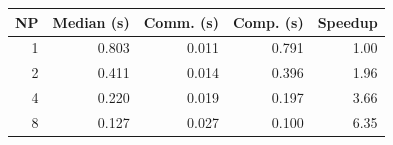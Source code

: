 \begin{tabular}{rrrrr}
  \toprule
  NP & Median (s) & Comm. (s) & Comp. (s) & Speedup \\
  \midrule
  1 & 0.803 & 0.011 & 0.791 & 1.00 \\
  2 & 0.411 & 0.014 & 0.396 & 1.96 \\
  4 & 0.220 & 0.019 & 0.197 & 3.66 \\
  8 & 0.127 & 0.027 & 0.100 & 6.35 \\
  \bottomrule
\end{tabular}
